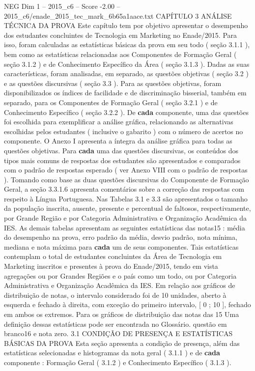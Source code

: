 \begin{textsample}{NEG Dim 1 – 2015\_c6 – Score -2.00 – 2015\_c6/enade\_2015\_tec\_mark\_6b65a1aace.txt}  \label{ex:f1_neg_281}
CAPÍTULO 3 ANÁLISE TÉCNICA DA PROVA Este capítulo tem por objetivo apresentar o desempenho dos estudantes concluintes de Tecnologia em Marketing no Enade/2015.
Para isso, foram calculadas as estatísticas básicas da prova em seu todo ( seção 3.1.1 ), bem como as estatísticas relacionadas aos Componentes de Formação Geral ( seção 3.1.2 ) e de Conhecimento Específico da Área ( seção 3.1.3 ).
Dadas as suas características, foram analisadas, em separado, as questões objetivas ( seção 3.2 ) e as questões discursivas ( seção 3.3 ).
Para as questões objetivas, foram disponibilizados os índices de facilidade e de discriminação bisserial, também em separado, para os Componentes de Formação Geral ( seção 3.2.1 ) e de Conhecimento Específico ( seção 3.2.2 ).
De \textbf{cada} componente, uma das questões foi escolhida para exemplificar a análise gráfica, relacionando as alternativas escolhidas pelos estudantes ( inclusive o gabarito ) com o número de acertos no componente.
O Anexo I apresenta a íntegra da análise gráfica para todas as questões objetivas.
Para \textbf{cada} uma das questões discursivas, os conteúdos dos tipos mais comuns de respostas dos estudantes são apresentados e comparados com o padrão de respostas esperado ( ver Anexo VIII com o padrão de respostas ).
Tomando como base as duas questões discursivas do Componente de Formação Geral, a seção 3.3.1.6 apresenta comentários sobre a correção das respostas com respeito à Língua Portuguesa.
Nas Tabelas 3.1 e 3.3 são apresentados o tamanho da população inscrita, ausente, presente e percentual de faltosos, respectivamente, por Grande Região e por Categoria Administrativa e Organização Acadêmica da IES.
As demais tabelas apresentam as seguintes estatísticas das notas15 : média do desempenho na prova, erro padrão da média, desvio padrão, nota mínima, mediana e nota máxima para \textbf{cada} um de seus componentes.
Tais estatísticas contemplam o total de estudantes concluintes da Área de Tecnologia em Marketing inscritos e presentes à prova do Enade/2015, tendo em vista agregações ou por Grandes Regiões e o país como um todo, ou por Categoria Administrativa e Organização Acadêmica da IES.
Em relação aos gráficos de distribuição de notas, o intervalo considerado foi de 10 unidades, aberto à esquerda e fechado à direita, com exceção do primeiro intervalo, [ 0 ; 10 ], fechado em ambos os extremos.
Para os gráficos de distribuição das notas das 15 Uma definição dessas estatísticas pode ser encontrada no Glossário. questão em branco16 e nota zero. 3.1 CONDIÇÃO DE PRESENÇA E ESTATÍSTICAS BÁSICAS DA PROVA Esta seção apresenta a condição de presença, além das estatísticas selecionadas e histogramas da nota geral ( 3.1.1 ) e de \textbf{cada} componente : Formação Geral ( 3.1.2 ) e Conhecimento Específico ( 3.1.3 ).

\end{textsample}
